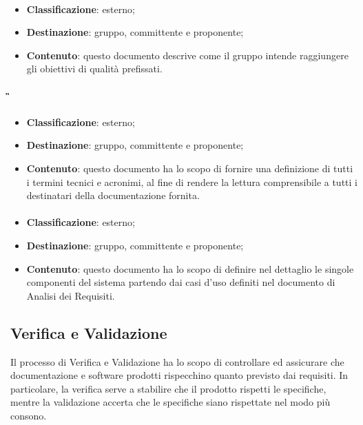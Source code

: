 			\paragraph{\PdQ}
			\begin{itemize}
				\item \textbf{Classificazione}: esterno;
				\item \textbf{Destinazione}: gruppo, committente e proponente;
				\item \textbf{Contenuto}: questo documento descrive come il gruppo \textit{\gruppo} intende raggiungere gli obiettivi di qualità prefissati.
			\end{itemize}

			\paragraph{\G}
			\begin{itemize}
				\item \textbf{Classificazione}: esterno;
				\item \textbf{Destinazione}: gruppo, committente e proponente;
				\item \textbf{Contenuto}: questo documento ha lo scopo di fornire una definizione di tutti i termini tecnici e acronimi, al fine di rendere la lettura comprensibile a tutti i destinatari della documentazione fornita.
			\end{itemize}
		\paragraph{\ST}
		\begin{itemize}
			\item \textbf{Classificazione}: esterno;
			\item \textbf{Destinazione}: gruppo, committente e proponente;
			\item \textbf{Contenuto}: questo documento ha lo scopo di definire nel dettaglio le singole componenti del sistema partendo dai casi d'uso definiti nel documento di Analisi dei Requisiti.
		\end{itemize}

	\subsection{Verifica e Validazione}
	Il processo di Verifica e Validazione ha lo scopo di controllare ed assicurare che documentazione e software prodotti rispecchino quanto previsto dai requisiti. In particolare, la verifica serve a stabilire che il prodotto rispetti le specifiche, mentre la validazione accerta che le specifiche siano rispettate nel modo più consono.

